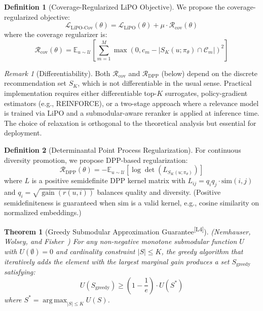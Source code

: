 \documentclass[11pt,a4paper]{article}
\theoremstyle{definition}
\newtheorem{definition}{Definition}[section]
\theoremstyle{plain}
\newtheorem{theorem}{Theorem}[section]
\theoremstyle{remark}
\newtheorem{remark}{Remark}[section]
\newcommand{\E}{\mathbb{E}}
\newcommand{\argmax}{\operatorname*{arg\,max}}
\DeclareMathOperator{\gain}{gain}
\newcommand{\leanmark}{\textsuperscript{\textcolor{green!50!black}{[L4]}}}
\begin{document}
\begin{definition}[Coverage-Regularized LiPO Objective]
\label{def:coverage_lipo}
We propose the coverage-regularized objective:
\begin{equation}
    \mathcal{L}_{\text{LiPO-Cov}}(\theta) = \mathcal{L}_{\text{LiPO}}(\theta) + \mu \cdot \mathcal{R}_{\text{cov}}(\theta)
\end{equation}
where the coverage regularizer is:
\begin{equation}
    \mathcal{R}_{\text{cov}}(\theta) = \E_{u \sim \mathcal{U}} \left[ \sum_{m=1}^{M} \max\left(0, c_m - |S_K(u; \pi_\theta) \cap \mathcal{C}_m|\right)^2 \right]
\end{equation}
\end{definition}

\begin{remark}[Differentiability]
\label{rem:differentiability}
Both $\mathcal{R}_{\text{cov}}$ and $\mathcal{R}_{\text{DPP}}$ (below) depend on the discrete recommendation set $S_K$, which is not differentiable in the usual sense. Practical implementation requires either differentiable top-$K$ surrogates, policy-gradient estimators (e.g., REINFORCE), or a two-stage approach where a relevance model is trained via LiPO and a submodular-aware reranker is applied at inference time. The choice of relaxation is orthogonal to the theoretical analysis but essential for deployment.
\end{remark}

\begin{definition}[Determinantal Point Process Regularization]
\label{def:dpp}
For continuous diversity promotion, we propose DPP-based regularization:
\begin{equation}
    \mathcal{R}_{\text{DPP}}(\theta) = -\E_{u \sim \mathcal{U}} \left[ \log \det(L_{S_K(u; \pi_\theta)}) \right]
\end{equation}
where $L$ is a positive semidefinite DPP kernel matrix with $L_{ij} = q_i q_j \cdot \text{sim}(i, j)$ and $q_i = \sqrt{\gain(r(u, i))}$ balances quality and diversity. (Positive semidefiniteness is guaranteed when $\text{sim}$ is a valid kernel, e.g., cosine similarity on normalized embeddings.)
\end{definition}

\begin{theorem}[Greedy Submodular Approximation Guarantee\leanmark]
\label{thm:nwf}
(Nemhauser, Wolsey, and Fisher~\cite{nemhauser1978}) For any non-negative monotone submodular function $U$ with $U(\emptyset) = 0$ and cardinality constraint $|S| \leq K$, the greedy algorithm that iteratively adds the element with the largest marginal gain produces a set $S_{\mathrm{greedy}}$ satisfying:
\begin{equation}
    U(S_{\mathrm{greedy}}) \geq \left(1 - \frac{1}{e}\right) \cdot U(S^*)
\end{equation}
where $S^* = \argmax_{|S| \leq K} U(S)$.
\end{theorem}
\end{document}
